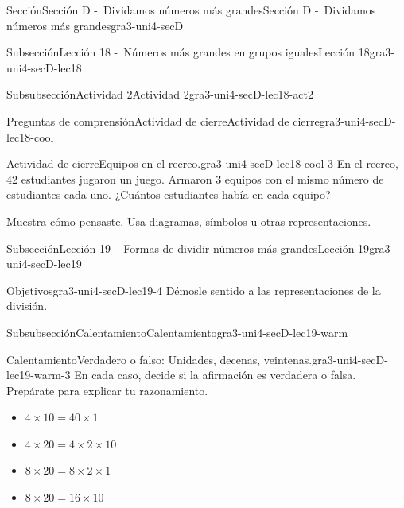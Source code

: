 \documentclass[twoside,10pt,]{article}
\begin{document}
\begin{sectionptx}{Sección}{Sección D -~Dividamos números más grandes}{}{Sección D -~Dividamos números más grandes}{}{}{gra3-uni4-secD}
\begin{subsectionptx}{Subsección}{Lección 18 -~Números más grandes en grupos iguales}{}{Lección 18}{}{}{gra3-uni4-secD-lec18}
\begin{subsubsectionptx}{Subsubsección}{Actividad 2}{}{Actividad 2}{}{}{gra3-uni4-secD-lec18-act2}
\end{subsubsectionptx}
%
%
\typeout{************************************************}
\typeout{************************************************}
%
\begin{reading-questions-subsubsection}{Preguntas de comprensión}{Actividad de cierre}{}{Actividad de cierre}{}{}{gra3-uni4-secD-lec18-cool}
\begin{project}{Actividad de cierre}{Equipos en el recreo.}{gra3-uni4-secD-lec18-cool-3}%
En el recreo, \(42\) estudiantes jugaron un juego. Armaron \(3\) equipos con el mismo número de estudiantes cada uno. ¿Cuántos estudiantes había en cada equipo?%
\par
Muestra cómo pensaste. Usa diagramas, símbolos u otras representaciones.%
\end{project}%
\end{reading-questions-subsubsection}
\end{subsectionptx}
%
%
\typeout{************************************************}
\typeout{************************************************}
%
\begin{subsectionptx}{Subsección}{Lección 19 -~Formas de dividir números más grandes}{}{Lección 19}{}{}{gra3-uni4-secD-lec19}
\begin{objectives}{Objetivos}{gra3-uni4-secD-lec19-4}
Démosle sentido a las representaciones de la división.%
\end{objectives}
%
%
\typeout{************************************************}
\typeout{************************************************}
%
\begin{subsubsectionptx}{Subsubsección}{Calentamiento}{}{Calentamiento}{}{}{gra3-uni4-secD-lec19-warm}
\begin{exploration}{Calentamiento}{Verdadero o falso: Unidades, decenas, veintenas.}{gra3-uni4-secD-lec19-warm-3}%
En cada caso, decide si la afirmación es verdadera o falsa. Prepárate para explicar tu razonamiento.%
%
\begin{itemize}[label=\textbullet]
\item{}\(\displaystyle 4 \times 10 = 40 \times 1\)%
\item{}\(\displaystyle 4 \times 20 = 4 \times 2 \times 10\)%
\item{}\(\displaystyle 8 \times 20 = 8 \times 2 \times 1\)%
\item{}\(\displaystyle 8 \times 20 = 16 \times 10\)%

\end{itemize}
\end{exploration}
\end{subsubsectionptx}
\end{subsectionptx}
\end{sectionptx}
\end{document}
